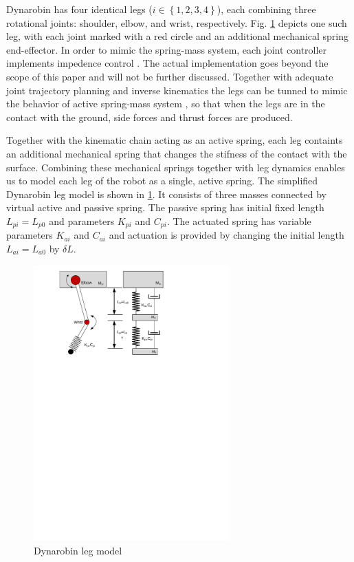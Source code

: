 

Dynarobin has four identical legs ($i\in \left \{ 1,2,3,4 \right \}$), each combining three rotational joints: shoulder, elbow, and wrist, respectively. Fig. \ref{fig:DynarobinLEG} depicts one such leg, with each joint marked with a red circle and an additional mechanical spring end-effector. In order to mimic the spring-mass system, each joint controller implements impedence control \cite{citeulike:2203614}. The actual implementation goes beyond the scope of this paper and will not be further discussed. Together with adequate joint trajectory planning and inverse kinematics the legs can be tunned to mimic the behavior of active spring-mass system \cite{Havoutis01}, so that when the legs are in the contact with the ground, side forces and thrust forces are produced.

Together with the kinematic chain acting as an active spring, each leg containts an additional mechanical spring that changes the stifness of the contact with the surface. Combining these mechanical springs together with leg dynamics enables us to model each leg of the robot as a single, active spring. The simplified Dynarobin leg model is shown in \ref{fig:DynarobinLEG}. It consists of three masses connected by virtual active and passive spring. The passive spring has initial fixed length $L_{pi}=L_{p0}$ and parameters $K_{pi}$ and $C_{pi}$.  The actuated spring has variable parameters $K_{ai}$ and $C_{ai}$ and actuation is provided by changing the initial length $L_{ai}=L_{a0}$ by $\delta L$.
\begin{figure}
	\centering
	\includegraphics[width=75mm]{./pictures/Dynarobin_leg.pdf}
	\caption{Dynarobin leg model}
	\label{fig:DynarobinLEG}
\end{figure}

